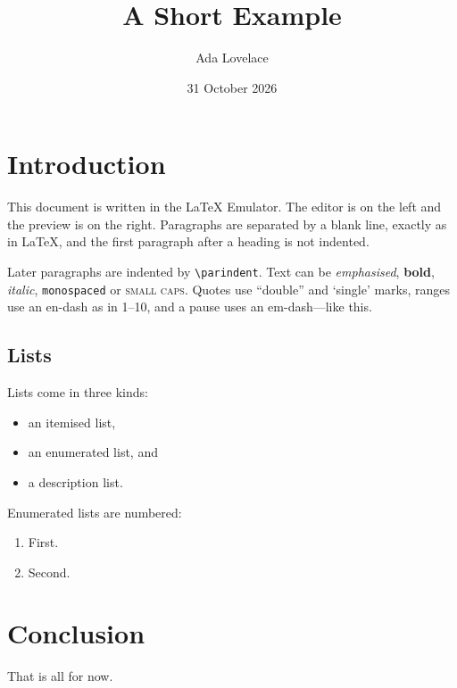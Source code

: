 \documentclass[11pt,a4paper]{article}
\title{A Short Example}
\author{Ada Lovelace}
\date{31 October 2026}
\begin{document}
\maketitle

\section{Introduction}
This document is written in the LaTeX Emulator. The editor is on the left
and the preview is on the right. Paragraphs are separated by a blank line,
exactly as in \LaTeX, and the first paragraph after a heading is not
indented.

Later paragraphs are indented by \verb|\parindent|. Text can be
\emph{emphasised}, \textbf{bold}, \textit{italic}, \texttt{monospaced} or
\textsc{small caps}. Quotes use ``double'' and `single' marks, ranges use
an en-dash as in 1--10, and a pause uses an em-dash---like this.

\subsection{Lists}
Lists come in three kinds:
\begin{itemize}
  \item an itemised list,
  \item an enumerated list, and
  \item a description list.
\end{itemize}
Enumerated lists are numbered:
\begin{enumerate}
  \item First.
  \item Second.
\end{enumerate}

\section{Conclusion}
That is all for now.
\end{document}
